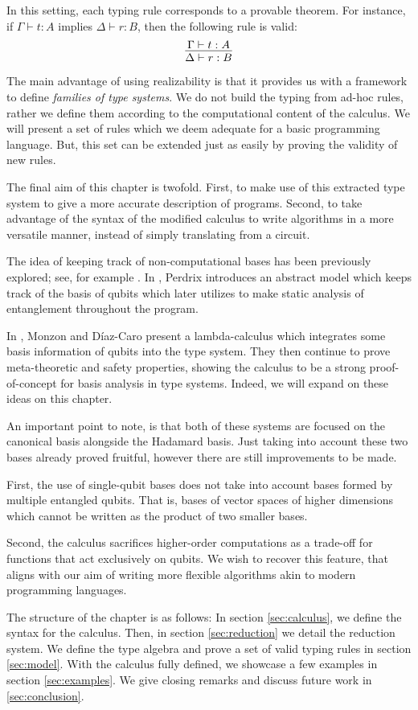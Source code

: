 In this setting, each typing rule corresponds to a provable theorem. For instance, if $\Gamma \vdash t : A$ implies $\Delta \vdash r : B$, then the following rule is valid:
\[
  \infer{\Delta\vdash r:B}{\Gamma\vdash t:A}
\]

The main advantage of using realizability is that it provides us with a framework to define \emph{families of type systems}. We do not build the typing from ad-hoc rules, rather we define them according to the computational content of the calculus. We will present a set of rules which we deem adequate for a basic programming language. But, this set can be extended just as easily by proving the validity of new rules.

The final aim of this chapter is twofold. First, to make use of this extracted type system to give a more accurate description of programs. Second, to take advantage of the syntax of the modified calculus to write algorithms in a more versatile manner, instead of simply translating from a circuit.

The idea of keeping track of non-computational bases has been previously explored; see, for example \cite{Perdrix2008,Monzon2025}. In \cite{Perdrix2008}, Perdrix introduces an abstract model which keeps track of the basis of qubits which later utilizes to make static analysis of entanglement throughout the program.

In \cite{Monzon2025}, Monzon and Díaz-Caro present a lambda-calculus which integrates some basis information of qubits into the type system. They then continue to prove meta-theoretic and safety properties, showing the calculus to be a strong proof-of-concept for basis analysis in type systems. Indeed, we will expand on these ideas on this chapter. 

An important point to note, is that both of these systems are focused on the canonical basis alongside the Hadamard basis. Just taking into account these two bases already proved fruitful, however there are still improvements to be made. 

First, the use of single-qubit bases does not take into account bases formed by multiple entangled qubits. That is, bases of vector spaces of higher dimensions which cannot be written as the product of two smaller bases.

Second, the calculus \cite{Monzon2025} sacrifices higher-order computations as a trade-off for functions that act exclusively on qubits. We wish to recover this feature, that aligns with our aim of writing more flexible algorithms akin to modern programming languages.

The structure of the chapter is as follows: In section \ref{sec:calculus}, we define the syntax for the calculus. Then, in section \ref{sec:reduction} we detail the reduction system. We define the type algebra and prove a set of valid typing rules in section \ref{sec:model}. With the calculus fully defined, we showcase a few examples in section \ref{sec:examples}. We give closing remarks and discuss future work in \ref{sec:conclusion}.
